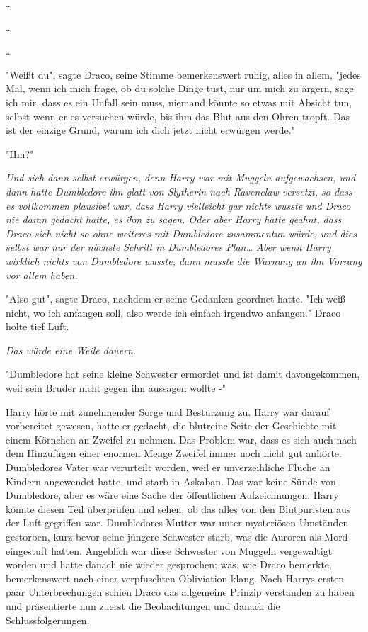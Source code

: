 {…

…

…

"Weißt du", sagte Draco, seine Stimme bemerkenswert ruhig, alles in allem, "jedes Mal, wenn ich mich frage, ob du solche Dinge tust, nur um mich zu ärgern, sage ich mir, dass es ein Unfall sein muss, niemand könnte so etwas mit Absicht tun, selbst wenn er es versuchen würde, bis ihm das Blut aus den Ohren tropft. Das ist der einzige Grund, warum ich dich jetzt nicht erwürgen werde."

"Hm?"

\emph{Und sich dann selbst erwürgen, denn Harry war mit Muggeln aufgewachsen, und dann hatte Dumbledore ihn glatt von Slytherin nach Ravenclaw versetzt, so dass es vollkommen plausibel war, dass Harry vielleicht gar nichts wusste und Draco nie daran gedacht hatte, es ihm zu sagen. Oder aber Harry hatte geahnt, dass Draco sich nicht so ohne weiteres mit Dumbledore zusammentun würde, und dies selbst war nur der nächste Schritt in Dumbledores Plan… Aber wenn Harry wirklich nichts von Dumbledore wusste, dann musste die Warnung an ihn Vorrang vor allem haben.}

"Also gut", sagte Draco, nachdem er seine Gedanken geordnet hatte. "Ich weiß nicht, wo ich anfangen soll, also werde ich einfach irgendwo anfangen." Draco holte tief Luft.

\emph{Das würde eine Weile dauern.}

"Dumbledore hat seine kleine Schwester ermordet und ist damit davongekommen, weil sein Bruder nicht gegen ihn aussagen wollte -"

Harry hörte mit zunehmender Sorge und Bestürzung zu. Harry war darauf vorbereitet gewesen, hatte er gedacht, die blutreine Seite der Geschichte mit einem Körnchen an Zweifel zu nehmen. Das Problem war, dass es sich auch nach dem Hinzufügen einer enormen Menge Zweifel immer noch nicht gut anhörte. Dumbledores Vater war verurteilt worden, weil er unverzeihliche Flüche an Kindern angewendet hatte, und starb in Askaban. Das war keine Sünde von Dumbledore, aber es wäre eine Sache der öffentlichen Aufzeichnungen. Harry könnte diesen Teil überprüfen und sehen, ob das alles von den Blutpuristen aus der Luft gegriffen war. Dumbledores Mutter war unter mysteriösen Umständen gestorben, kurz bevor seine jüngere Schwester starb, was die Auroren als Mord eingestuft hatten. Angeblich war diese Schwester von Muggeln vergewaltigt worden und hatte danach nie wieder gesprochen; was, wie Draco bemerkte, bemerkenswert nach einer verpfuschten Obliviation klang. Nach Harrys ersten paar Unterbrechungen schien Draco das allgemeine Prinzip verstanden zu haben und präsentierte nun zuerst die Beobachtungen und danach die Schlussfolgerungen.

}
